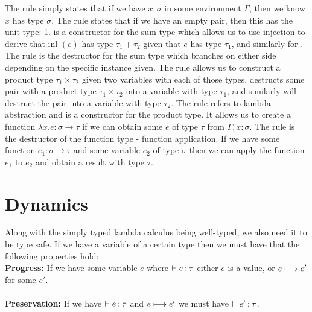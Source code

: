 The  rule simply states that if we have $x: \sigma$ in some environment $\Gamma$, 
then we know $x$ has type $\sigma$. The  rule states that if we have an empty pair, then this has 
the unit type: 1.  is a constructor for the sum type which allows us to use injection 
to derive that inl $(e)$ has type $\tau_1 + \tau_2$ given that $e$ has type $\tau_1$, and similarly for 
. The  rule is the destructor for the sum type which branches on either
side depending on the specific instance given. %
The  rule allows us to construct a product type $\tau_1 \times \tau_2$ given two variables
with each of those types.  destructs some pair with a product type $\tau_1 \times \tau_2$ 
into a variable with type $\tau_1$, and similarly  will destruct the pair into a variable 
with type $\tau_2$. 
The  rule refers to lambda abstraction and is a constructor for the product type. It allows
us to create a function $\lambda x. e : \sigma \rightarrow \tau$ if we can obtain some $e$ of type $\tau$
from $\Gamma, x: \sigma$. The  rule is the destructor of the function type - function 
application. If we have some function $e_1: \sigma \rightarrow \tau$ and some variable $e_2$ of type 
$\sigma$ then we can apply the function $e_1$ to $e_2$ and obtain a result with type $\tau$.
\\

\section{Dynamics}

\noindent
Along with the simply typed lambda calculus being well-typed, we also need it to be type safe. If we 
have a variable of a certain type then we must have that the following properties hold: \\

\noindent
\textbf{Progress:} If we have some variable $e$ where $\vdash e\mathbin{:}\tau$ either $e$ is a 
value, or $e \longmapsto e'$ for some $e'$. \\\\
\textbf{Preservation:} If we have $\vdash e\mathbin{:}\tau$ and $e \longmapsto e'$ we must have 
$\vdash e'\mathbin{:}\tau$.

